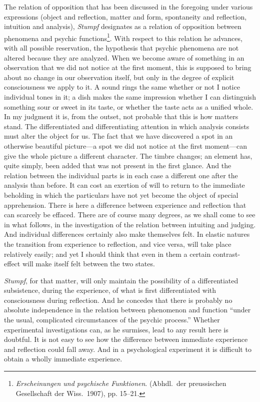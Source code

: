 \documentclass[12pt,a4paper]{book}
\newcommand{\opage}[1]{\marginnote{\footnotesize\textit{[#1]}}}
\begin{document}
\opage{18}The relation of opposition that has been discussed in the foregoing
under various expressions (object and reflection, matter and form,
spontaneity and reflection, intuition and analysis), \emph{Stumpf}
designates as a relation of opposition between phenomena and psychic
functions\footnote{\emph{Erscheinungen und psychische Funktionen}.
(Abhdl.\ der preussischen Gesellschaft der Wiss.\ 1907), pp. 15--21.}.
With respect to this relation he advances, with all possible
reservation, the hypothesis that psychic phenomena are not altered
because they are analyzed. When we become aware of something in an
observation that we did not notice at the first moment, this is supposed
to bring about no change in our observation itself, but only in the
degree of explicit consciousness we apply to it. A sound rings the same
whether or not I notice individual tones in it; a dish makes the same
impression whether I can distinguish something sour or sweet in its
taste, or whether the taste acts as a unified whole. In my judgment it
is, from the outset, not probable that this is how matters stand. The
differentiated and differentiating attention in which analysis consists
must alter the object for us. The fact that we have discovered a spot in
an otherwise beautiful picture---a spot we did not notice at the first
moment---can give the whole picture a different character. The timbre
changes; an element has, quite simply, been added that was not present
in the first glance. And the relation between the individual parts is in
each case a different one after the analysis than before. It can cost an
exertion of will to return to the immediate beholding in which the
particulars have not yet become the object of special apprehension.
There is here a difference between experience and reflection that can
scarcely be effaced. There are of course many degrees, as we shall come
to see in what follows, in the investigation of the relation between
intuiting and judging. And individual differences certainly also make
themselves felt. In elastic natures the transition from experience to
reflection, and vice versa, will take place relatively easily; and yet I
should think that even in them a certain contrast-effect will make
itself felt between the two states.

\emph{\opage{19}Stumpf}, for that matter, will only maintain the possibility of a
differentiated subsistence, during the experience, of what is first
differentiated with consciousness during reflection. And he concedes
that there is probably no absolute independence in the relation between
phenomenon and function ``under the usual, complicated circumstances of
the psychic process.'' Whether experimental investigations can, as he
surmises, lead to any result here is doubtful. It is not easy to see how
the difference between immediate experience and reflection could fall
away. And in a psychological experiment it is difficult to obtain a
wholly immediate experience.
\end{document}
